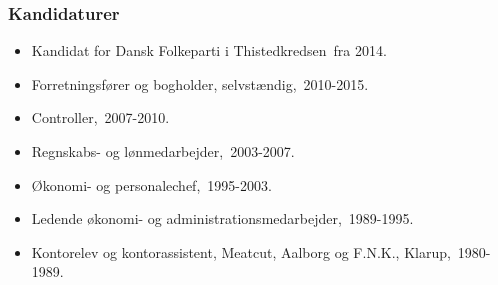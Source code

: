 \documentclass[11pt, a4paper]{awesome-cv}
\begin{document}
\begin{cvletter}
\subsubsection*{Kandidaturer}
\begin{itemize}
\item Kandidat for Dansk Folkeparti i Thistedkredsen fra 2014.
\end{itemize}
\begin{itemize}
\item Forretningsfører og bogholder, selvstændig, 2010-2015.
\item Controller, 2007-2010.
\item Regnskabs- og lønmedarbejder, 2003-2007.
\item Økonomi- og personalechef, 1995-2003.
\item Ledende økonomi- og administrationsmedarbejder, 1989-1995.
\item Kontorelev og kontorassistent, Meatcut, Aalborg og F.N.K., Klarup, 1980-1989.
\end{itemize}
\end{cvletter}
\end{document}
